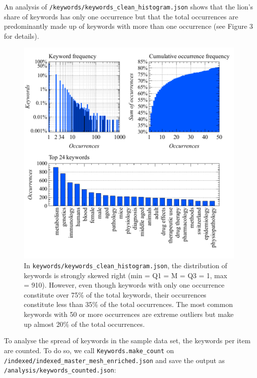 An analysis of \texttt{/keywords/keywords\_clean\_histogram.json} shows
that the lion's share of keywords has only one occurrence but that the
total occurrences are predominantly made up of keywords with more than
one occurrence (see Figure 3 for details).

\begin{figure}
\centering
\includegraphics{images/keywords_clean_histogram_abc.pdf}
\caption{In \texttt{keywords/keywords\_clean\_histogram.json}, the
distribution of keywords is strongly skewed right (min = Q1 = M = Q3 =
1, max = 910). However, even though keywords with only one occurrence
constitute over 75\% of the total keywords, their occurrences constitute
less than 35\% of the total occurrences. The most common keywords with
50 or more occurrences are extreme outliers but make up almost 20\% of
the total occurrences.}
\end{figure}

To analyse the spread of keywords in the sample data set, the keywords
per item are counted. To do so, we call \texttt{Keywords.make\_count} on
\texttt{/indexed/indexed\_master\_mesh\_enriched.json} and save the
output as \texttt{/analysis/keywords\_counted.json}:

\begin{Shaded}
\begin{Highlighting}[]
\OperatorTok{=}\NormalTok{)}
\OperatorTok{=}
\NormalTok{)}
\end{Highlighting}
\end{Shaded}


